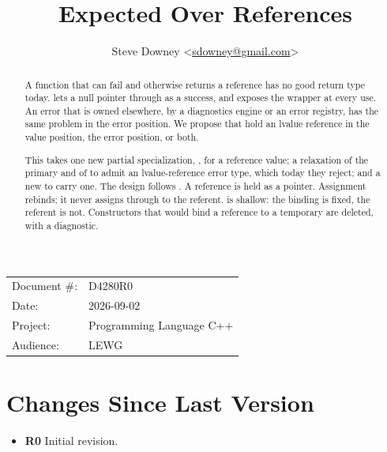 \documentclass[a4paper,10pt,oneside,openany,final,article]{memoir}
\begin{document}
\title{Expected Over References}
\author{
  Steve Downey \small<\href{mailto:sdowney@gmail.com}{sdowney@gmail.com}> \\
}
\date{} %
\maketitle

\begin{flushright}
  \begin{tabular}{ll}
    Document \#: & D4280R0 \\
    Date: & 2026-09-02 \\
    Project: & Programming Language C++ \\
    Audience: & LEWG
  \end{tabular}
\end{flushright}

\begin{abstract}
  A function that can fail and otherwise returns a reference has no good
  return type today.  lets a null pointer through as a
  success, and  exposes the wrapper
  at every use. An error that is owned elsewhere, by a diagnostics engine or
  an error registry, has the same problem in the error position. We propose
  that  hold an lvalue reference in the value position,
  the error position, or both.

  This takes one new partial specialization, , for a
  reference value; a relaxation of the primary  and of
   to admit an lvalue-reference error type, which
  today they reject; and a new  to carry one. The
  design follows  \cite{P2988R12}. A reference is held
  as a pointer. Assignment rebinds; it never assigns through to the referent.
   is shallow: the binding is fixed, the referent is not.
  Constructors that would bind a reference to a temporary are deleted, with a
  diagnostic.
\end{abstract}

\tableofcontents*

\chapter*{Changes Since Last Version}

\begin{itemize}
\item \textbf{R0} Initial revision.
\end{itemize}
\end{document}
